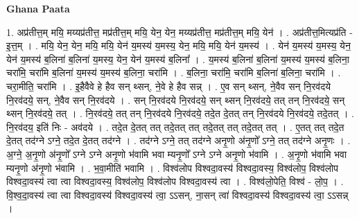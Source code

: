 \documentclass[17pt]{extarticle}
\begin{document}
\textbf{Ghana Paata } \newline

1. अप्र॑तीत्त॒म् मयि॒ मय्यप्र॑तीत्त॒ मप्र॑तीत्त॒म् मयि॒ येन॒ येन॒ मय्यप्र॑तीत्त॒ मप्र॑तीत्त॒म् मयि॒ येन॑ । . अप्र॑तीत्त॒मित्यप्र॑ति - इ॒त्त॒म् । . मयि॒ येन॒ येन॒ मयि॒ मयि॒ येन॑ य॒मस्य॑ य॒मस्य॒ येन॒ मयि॒ मयि॒ येन॑ य॒मस्य॑ । . येन॑ य॒मस्य॑ य॒मस्य॒ येन॒ येन॑ य॒मस्य॑ ब॒लिना॑ ब॒लिना॑ य॒मस्य॒ येन॒ येन॑ य॒मस्य॑ ब॒लिना᳚ । . य॒मस्य॑ ब॒लिना॑ ब॒लिना॑ य॒मस्य॑ य॒मस्य॑ ब॒लिना॒ चरा॑मि॒ चरा॑मि ब॒लिना॑ य॒मस्य॑ य॒मस्य॑ ब॒लिना॒ चरा॑मि । . ब॒लिना॒ चरा॑मि॒ चरा॑मि ब॒लिना॑ ब॒लिना॒ चरा॑मि । . चरा॒मीति॒ चरा॑मि । . इ॒हैवैवे हे हैव सन् थ्सन्, ने॒वे हे हैव सन्न् । . ए॒व सन् थ्सन्, ने॒वैव सन् नि॒रव॑दये नि॒रव॑दये॒ सन्, ने॒वैव सन् नि॒रव॑दये । . सन् नि॒रव॑दये नि॒रव॑दये॒ सन् थ्सन् नि॒रव॑दये॒ तत् तन् नि॒रव॑दये॒ सन् थ्सन् नि॒रव॑दये॒ तत् । . नि॒रव॑दये॒ तत् तन् नि॒रव॑दये नि॒रव॑दये॒ तदे॒त दे॒तत् तन् नि॒रव॑दये नि॒रव॑दये॒ तदे॒तत् । . नि॒रव॑दय॒ इति॑ निः - अव॑दये । . तदे॒त दे॒तत् तत् तदे॒तत् तत् तदे॒तत् तत् तदे॒तत् तत् । . ए॒तत् तत् तदे॒त दे॒तत् तद॑ग्ने ऽग्ने॒ तदे॒त दे॒तत् तद॑ग्ने । . तद॑ग्ने ऽग्ने॒ तत् तद॑ग्ने अनृ॒णो अ॑नृ॒णो᳚ ऽग्ने॒ तत् तद॑ग्ने अनृ॒णः । . अ॒ग्ने॒ अ॒नृ॒णो अ॑नृ॒णो᳚ ऽग्ने ऽग्ने अनृ॒णो भ॑वामि भवा म्यनृ॒णो᳚ ऽग्ने ऽग्ने अनृ॒णो भ॑वामि । . अ॒नृ॒णो भ॑वामि भवा म्यनृ॒णो अ॑नृ॒णो भ॑वामि । . भ॒वा॒मीति॑ भवामि । . विश्व॑लोप विश्वदा॒वस्य॑ विश्वदा॒वस्य॒ विश्व॑लोप॒ विश्व॑लोप विश्वदा॒वस्य॑ त्वा त्वा विश्वदा॒वस्य॒ विश्व॑लोप॒ विश्व॑लोप विश्वदा॒वस्य॑ त्वा । . विश्व॑लो॒पेति॒ विश्व॑ - लो॒प॒ । . वि॒श्व॒दा॒वस्य॑ त्वा त्वा विश्वदा॒वस्य॑ विश्वदा॒वस्य॑ त्वा॒ ऽऽसन्, ना॒सन् त्वा॑ विश्वदा॒वस्य॑ विश्वदा॒वस्य॑ त्वा॒ ऽऽसन्न् । \newline
\end{document}
